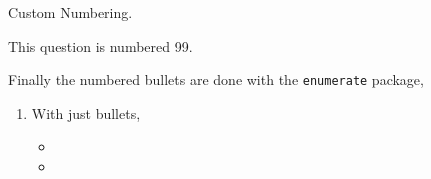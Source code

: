 \documentclass{homework}
\begin{document}
\begin{question}[99] Custom Numbering.

  This question is numbered 99.
\end{question}

\begin{question}
Finally the numbered bullets are done with the \texttt{enumerate} package,

\begin{enumerate}
  \item With just bullets,
  \begin{itemize}
    \item {}
    \item {}
  \end{itemize}
\end{enumerate}
\end{question}

\end{document}
